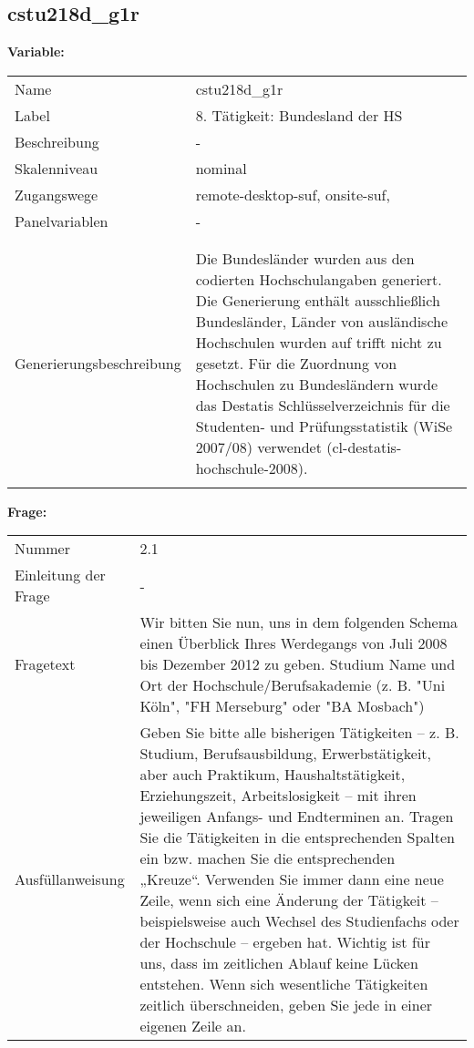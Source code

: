 	
	
	\subsection{cstu218d\_g1r}
	\label{subSection:cstu218d_g1r}

	\noindent\textbf{Variable:}\\
		\begin{tabular}{lL{11.3cm}}
			\label{tableVariable:cstu218d_g1r}
			Name & cstu218d\_g1r \\
			Label & 8. Tätigkeit: Bundesland der HS \\
			Beschreibung & - \\
			Skalenniveau & nominal \\
			Zugangswege &
				remote-desktop-suf,
				onsite-suf,
 \\
			Panelvariablen & -
			 \\
			 \\
 \\
					Generierungsbeschreibung & Die Bundesländer wurden aus den codierten Hochschulangaben generiert. Die Generierung enthält ausschließlich Bundesländer, Länder von ausländische Hochschulen wurden auf trifft nicht zu gesetzt. Für die Zuordnung von Hochschulen zu Bundesländern wurde das Destatis Schlüsselverzeichnis für die Studenten- und Prüfungsstatistik (WiSe 2007/08) verwendet (cl-destatis-hochschule-2008).
				 \\	
			 \\
		\end{tabular}

		\vspace*{1 cm}
		\noindent\textbf{Frage:}\\
		\begin{tabular}{lL{11.3cm}}
			\label{tableQuestion:cstu218d_g1r}
			Nummer & 2.1 \\
			Einleitung der Frage & - \\
			Fragetext & Wir bitten Sie nun, uns in dem folgenden Schema einen Überblick Ihres Werdegangs von Juli 2008 bis Dezember 2012 zu geben.
Studium
Name und Ort der Hochschule/Berufsakademie
(z. B. "Uni Köln", "FH Merseburg" oder "BA Mosbach") \\
			Ausfüllanweisung & Geben Sie bitte alle bisherigen Tätigkeiten – z. B. Studium, Berufsausbildung, Erwerbstätigkeit, aber auch Praktikum, Haushaltstätigkeit,
Erziehungszeit, Arbeitslosigkeit – mit ihren jeweiligen Anfangs- und Endterminen an. Tragen Sie die Tätigkeiten in die entsprechenden Spalten ein bzw. machen Sie die entsprechenden „Kreuze“. Verwenden Sie immer dann eine neue Zeile, wenn sich eine Änderung der Tätigkeit – beispielsweise auch Wechsel des Studienfachs oder der Hochschule – ergeben hat. Wichtig ist für uns, dass im zeitlichen Ablauf keine Lücken entstehen. Wenn sich wesentliche Tätigkeiten zeitlich überschneiden, geben Sie jede in einer eigenen Zeile an. \\
		\end{tabular}





